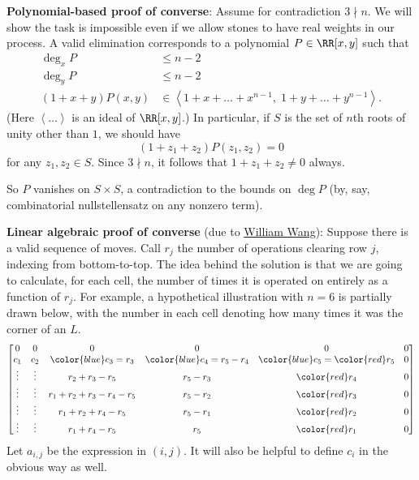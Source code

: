 \documentclass[11pt]{scrartcl}
\begin{document}
\medskip

\textbf{Polynomial-based proof of converse}:
Assume for contradiction $3 \nmid n$.
We will show the task is impossible
even if we allow stones to have real weights in our process.
A valid elimination corresponds to a polynomial $P \in \RR[x,y]$
such that
\begin{align*}
  \deg_x P &\le n-2 \\
  \deg_y P &\le n-2 \\
  (1+x+y) P(x,y)
  &\in \left< 1+x+\dots+x^{n-1}, \; 1+y+\dots+y^{n-1}\right>.
\end{align*}
(Here $\left< \dots\right>$ is an ideal of $\RR[x,y]$.)
In particular, if $S$ is the set of $n$th roots of unity other than $1$,
we should have
\[ (1+z_1+z_2) P\left( z_1, z_2 \right) = 0 \]
for any $z_1 , z_2 \in S$.
Since $3 \nmid n$, it follows that $1+z_1+z_2 \neq 0$ always.

So $P$ vanishes on $S \times S$,
a contradiction to the bounds on $\deg P$
(by, say, combinatorial nullstellensatz on any nonzero term).

\textbf{Linear algebraic proof of converse}
(due to \href{https://aops.com/community/p21499813}{William Wang}):
Suppose there is a valid sequence of moves.
Call $r_j$ the number of operations clearing row $j$,
indexing from bottom-to-top.
The idea behind the solution is that we are going to
calculate, for each cell, the number of times it is operated
on entirely as a function of $r_j$.
For example, a hypothetical illustration with $n=6$ is partially drawn below,
with the number in each cell denoting how many times it was the corner of an $L$.
\[
  \begin{bmatrix}
    0 & 0 & 0 & 0 & 0 & 0 \\
    c_1 & c_2 & {\color{blue}c_3}=r_3 & {\color{blue}c_4}=r_5-r_4 & {\color{blue}c_5}={\color{red}r_5} & 0 \\
    \vdots & \vdots & r_2+r_3-r_5  & r_5-r_3 & {\color{red}r_4} & 0  \\
    \vdots & \vdots & r_1+r_2+r_3-r_4-r_5 & r_5-r_2  & {\color{red}r_3} & 0  \\
    \vdots & \vdots & r_1+r_2+r_4-r_5  & r_5-r_1  & {\color{red}r_2} & 0  \\
    \vdots & \vdots & r_1+r_4-r_5  & r_5  & {\color{red}r_1} & 0  \\
  \end{bmatrix}
\]
Let $a_{i,j}$ be the expression in $(i,j)$.
It will also be helpful to define $c_i$ in the obvious way as well.
\end{document}
